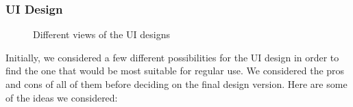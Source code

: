 \documentclass[11pt, a4paper]{article}
\begin{document}
\subsubsection{UI Design}
\begin{figure}[h!]
\centering
{}
\quad
{}
\caption{Different views of the UI designs}
\end{figure}

Initially, we considered a few different possibilities for the UI design in order to find the one that would be most suitable for regular use. We considered the pros and cons of all of them before deciding on the final design version. Here are some of the ideas we considered:
\end{document}
